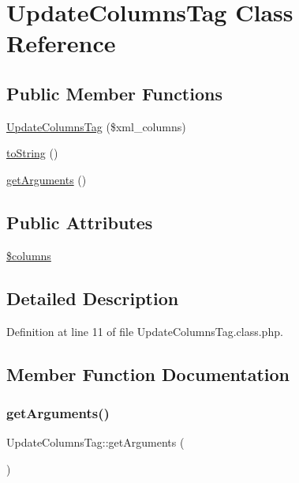 \hypertarget{classUpdateColumnsTag}{}\section{Update\+Columns\+Tag Class Reference}
\label{classUpdateColumnsTag}
\subsection*{Public Member Functions}
\begin{DoxyCompactItemize}
\item 
\hyperlink{classUpdateColumnsTag_ac046fb7c43564e290d1022aa8299e1aa}{Update\+Columns\+Tag} (\$xml\+\_\+columns)
\item 
\hyperlink{classUpdateColumnsTag_a7653306405140623b429c3751ac11d7f}{to\+String} ()
\item 
\hyperlink{classUpdateColumnsTag_ac964b7ba527d96007a8d3a5749326030}{get\+Arguments} ()
\end{DoxyCompactItemize}
\subsection*{Public Attributes}
\begin{DoxyCompactItemize}
\item 
\hyperlink{classUpdateColumnsTag_aa406bc3dae4ef8fde8679bc97a6141b6}{\$columns}
\end{DoxyCompactItemize}


\subsection{Detailed Description}


Definition at line 11 of file Update\+Columns\+Tag.\+class.\+php.



\subsection{Member Function Documentation}
\mbox{\label{classUpdateColumnsTag_ac964b7ba527d96007a8d3a5749326030}} 
\subsubsection{\texorpdfstring{get\+Arguments()}{getArguments()}}
{\footnotesize\ttfamily Update\+Columns\+Tag\+::get\+Arguments (\begin{DoxyParamCaption}{ }\end{DoxyParamCaption})}

